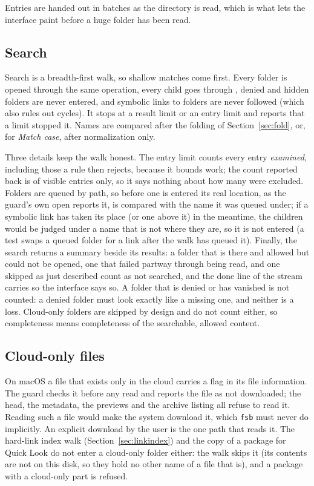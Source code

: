 Entries are handed out in batches as the directory is read, which is what lets the
interface paint before a huge folder has been read.

\subsection{Search}

Search is a breadth-first walk, so shallow matches come first.  Every folder is opened
through the same operation, every child goes through , denied and hidden
folders are never entered, and symbolic links to folders are never followed (which
also rules out cycles).  It stops at a result limit or an entry limit and reports that a limit
stopped it.  Names are compared after the folding of Section~\ref{sec:fold}, or, for
\emph{Match case}, after normalization only.

Three details keep the walk honest.  The entry limit counts every entry
\emph{examined}, including those a rule then rejects, because it bounds work; the
count reported back is of visible entries only, so it says nothing about how many were
excluded.  Folders are queued by path, so before one is entered its real location, as
the guard's own open reports it, is compared with the name it was queued under; if a
symbolic link has taken its place (or one above it) in the meantime, the children would
be judged under a name that is not where they are, so it is not entered (a test swaps a
queued folder for a link after the walk has queued it).  Finally, the search returns a
summary beside its results: a folder that is there and allowed but could not be opened,
one that failed partway through being read, and one skipped as just described count as
not searched, and the done line of the stream carries  so the
interface says so.  A folder that is denied or has vanished is not counted: a denied
folder must look exactly like a missing one, and neither is a loss.  Cloud-only folders
are skipped by design and do not count either, so completeness means completeness of
the searchable, allowed content.

\subsection{Cloud-only files}

On macOS a file that exists only in the cloud carries a flag in its file information.
The guard checks it before any read and reports the file as not downloaded; the head,
the metadata, the previews and the archive listing all refuse to read it.  Reading such
a file would make the system download it, which \texttt{fsb} must never do implicitly.
An explicit download by the user is the one path that reads it.  The hard-link index walk
(Section~\ref{sec:linkindex}) and the copy of a package for Quick Look do not enter a
cloud-only folder either: the walk skips it (its contents are not on this disk, so they
hold no other name of a file that is), and a package with a cloud-only part is refused.

